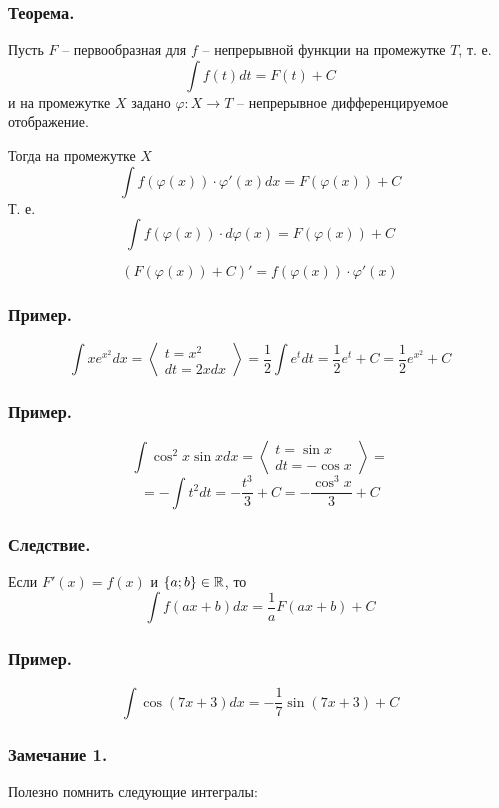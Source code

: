 \subsubsection{Теорема.}
Пусть $F$ -- первообразная для $f$ -- непрерывной функции на промежутке $T$, т. е.
$$\int f(t)dt=F(t)+C$$
и на промежутке $X$ задано $\varphi:X\to T$ -- непрерывное дифференцируемое отображение.

Тогда на промежутке $X$
$$\int f(\varphi(x))\cdot \varphi '(x) dx=F(\varphi(x))+C$$
Т. е.
$$\int f(\varphi(x))\cdot d\varphi(x)=F(\varphi(x))+C$$

\dokvo
$$(F(\varphi(x))+C)'=f(\varphi(x))\cdot \varphi'(x)$$
\dokno

\subsubsection{Пример.}

$$\int x e^{x^2} dx = 
\left<\begin{array}{c}
t=x^2 \\
dt=2xdx
\end{array}\right>= %
\frac{1}{2}\int e^t dt = \frac{1}{2} e^t +C = \frac{1}{2}e^{x^2}+C
$$

\subsubsection{Пример.}

$$\int \cos^2 x \sin x dx = 
\left<\begin{array}{c}
t=\sin x \\
dt=-\cos x
\end{array}\right>=$$ $$=
-\int t^2 dt = -\frac{t^3}{3}+C = -\frac{\cos^3 x}{3} +C
$$

\subsubsection{Следствие.}
Если $F'(x)=f(x)$ и $\{a;b\}\in\mathbb{R}$, то
$$\int f(ax+b)dx=\frac{1}{a}F(ax+b)+C$$

\subsubsection{Пример.}

$$\int\cos(7x+3)dx=-\frac{1}{7}\sin(7x+3)+C$$

\subsubsection{Замечание 1.}
Полезно помнить следующие интегралы:


